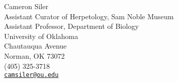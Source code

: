 Cameron Siler \\
\myIndent Assistant Curator of Herpetology, Sam Noble Museum \\
\myIndent Assistant Professor, Department of Biology \\
\myIndent University of Oklahoma \\
 Chautauqua Avenue \\
\myIndent Norman, OK 73072\\
\myIndent (405) 325-3718 \\
\myIndent \href{mailto:camsiler@ou.edu}{\tt camsiler@ou.edu}
